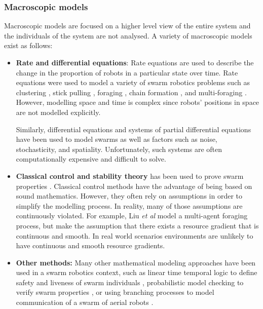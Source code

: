 \subsubsection{Macroscopic models}
\label{macroscopicmodels}

Macroscopic models are focused on a higher level view of the entire system and the individuals of the system are not analysed. A variety of macroscopic models exist as follows: 
\begin{itemize}
	\item \textbf{Rate and differential equations}: Rate equations are used to describe the change in the proportion of robots in a particular state over time. Rate equations were used to model a variety of swarm robotics problems such as  clustering \cite{martinoli1999understanding}, stick pulling \cite{lerman2001macroscopic}, foraging \cite{lerman2002mathematical}, chain formation \cite{trianni2002modeling}, and multi-foraging \cite{campo2007efficient}. However, modelling space and time is complex since robots' positions in space are not modelled explicitly.

Similarly, differential equations \cite{hamann2008framework} and systems of partial differential equations \cite{prorok2011multi} have been used to model swarms as well as factors such as noise, stochasticity, and spatiality. Unfortunately, such systems are often computationally expensive and difficult to solve.

	\item \textbf{Classical control and stability theory} has been used to prove swarm properties \cite{gazi2005stability,liu2004stable, schwager2011time}.  Classical control methods have the advantage of being based on sound mathematics. However, they often rely on assumptions in order to simplify the modelling process. In reality, many of those assumptions are continuously violated. For example, Liu \textit{et al} model a multi-agent foraging process, but make the assumption that there exists a resource gradient that is continuous and smooth. In real world scenarios environments are unlikely to have continuous and smooth resource gradients.

	
	
	\item \textbf{Other methods:}
	Many other mathematical modeling approaches have been used in a swarm robotics context, such as linear time temporal logic to define safety and liveness of swarm individuals \cite{winfield2005formal}, probabilistic model checking to verify swarm properties \cite{konur2012analysing}, or using branching processes to model communication of a swarm of aerial robots \cite{mathews2010establishing}. 
\end{itemize}

